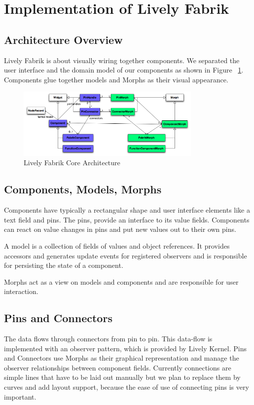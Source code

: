 \documentclass[pdftex, times, 10pt, twocolumn]{article}
\begin{document}
\section{Implementation of Lively Fabrik}


\subsection{Architecture Overview}
Lively Fabrik is about visually wiring together components. We separated the user interface and the domain model of our components as shown in Figure ~\ref{fig:LivelyFabrikCore}. Components glue together models and Morphs as their visual appearance.  



\begin{figure}[]\centering
\includegraphics[width=0.800000\textwidth]{LivelyFabrikCore.png} 

\caption{Lively Fabrik Core Architecture }
\label{fig:LivelyFabrikCore}
\end{figure}


\subsection{Components, Models, Morphs}
Components have typically a rectangular shape and user interface elements like a text field and pins.  The pins, provide an interface to its value fields. Components can react on value changes in pins and put new values out to their own pins.  

A model is a collection of fields of values and object references. It provides accessors and generates update events for registered observers and is responsible for persisting the state of a component. 

Morphs act as a view on models and components and are responsible for user interaction.  



\subsection{Pins and Connectors}
The data flows through connectors from pin to pin. This data-flow is implemented with an observer pattern, which is provided by Lively Kernel. Pins and Connectors use Morphs as their graphical representation and manage the observer relationships between component fields. Currently connections are simple lines that have to be laid out manually but we plan to replace them by curves and add layout support, because the ease of use of connecting pins is very important. 
\end{document}
